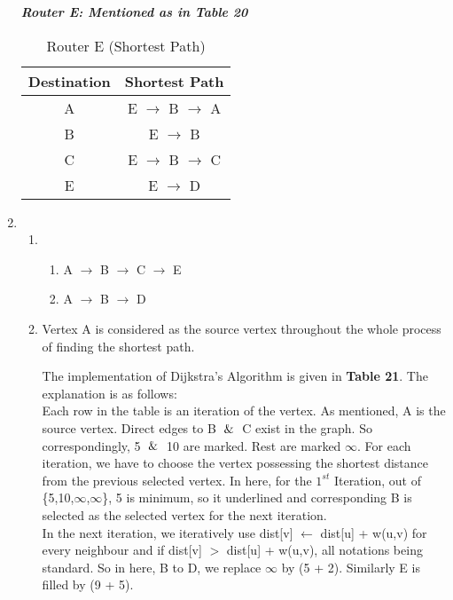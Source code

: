 \documentclass[12pt]{article}
\begin{document}
\begin{enumerate}
\textit{\textbf{Router E: Mentioned as in Table 20}} \\

\begin{table}[]
\begin{center}
\begin{tabular}{|c|c|}
\hline
Destination & Shortest Path                                     \\ \hline
A           & E $\rightarrow$ B $\rightarrow$ A                                 \\ \hline
B           & E $\rightarrow$ B                 \\ \hline
C           & E $\rightarrow$ B $\rightarrow$ C \\ \hline
E           & E $\rightarrow$ D                 \\ \hline
\end{tabular}
\caption{Router E (Shortest Path)}
\end{center}
\end{table}
    \item \begin{enumerate}[label=(\arabic*)]
        \item \begin{enumerate}[label=(\alph*)]
            \item A $\rightarrow$ B $\rightarrow$ C $\rightarrow$ E
            \item A $\rightarrow$ B $\rightarrow$ D
        \end{enumerate}
        \item Vertex A is considered as the source vertex throughout the whole process of finding the shortest path.
 
 The implementation of Dijkstra's Algorithm is given in \textbf{Table 21}. The explanation is as follows: \\
 Each row in the table is an iteration of the vertex. As mentioned, A is the source vertex. Direct edges to B $\And$ C exist in the graph. So correspondingly, 5 $\And$ 10 are marked. Rest are marked $\infty$. For each iteration, we have to choose the vertex possessing the shortest distance from the previous selected vertex. In here, for the $1^{st}$ Iteration, out of \{5,10,$\infty$,$\infty$\}, 5 is minimum, so it underlined and corresponding B is selected as the selected vertex for the next iteration. \\
 
 In the next iteration, we iteratively use dist[v] $\leftarrow$ dist[u] + w(u,v) for every neighbour and if dist[v] $>$ dist[u] + w(u,v), all notations being standard. So in here, B to D, we replace $\infty$ by (5 + 2). Similarly E is filled by (9 + 5). \\
 

\end{enumerate}
\end{enumerate}
\end{document}
